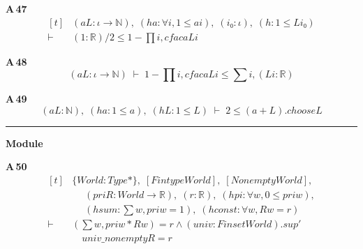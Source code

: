 \noindent\textbf{A\,47}\quad{}
{\footnotesize\[ \begin{aligned}[t]
&(\mathit{a} \mathit{L} : \iota \to \mathbb{N} ),\; (\mathit{ha} : \forall \mathit{i}, 1 \leq \mathit{a} \mathit{i}),\; (\mathit{i₀} : \iota ),\; (\mathit{h} : 1 \leq \mathit{L} \mathit{i₀})\\
\vdash\;&(1:\mathbb{R} ) / 2 \leq 1 - \textstyle\prod \mathit{i}, \mathit{cfac} \mathit{a} \mathit{L} \mathit{i}
\end{aligned} \]}

\noindent\textbf{A\,48}\quad{}
{\footnotesize\[ (\mathit{a} \mathit{L} : \iota \to \mathbb{N} ) \;\vdash\; 1 - \textstyle\prod \mathit{i}, \mathit{cfac} \mathit{a} \mathit{L} \mathit{i} \leq \textstyle\sum \mathit{i}, (\mathit{L} \mathit{i} : \mathbb{R} ) \]}

\noindent\textbf{A\,49}\quad{}
{\footnotesize\[ (\mathit{a} \mathit{L} : \mathbb{N} ),\; (\mathit{ha} : 1 \leq \mathit{a}),\; (\mathit{hL} : 1 \leq \mathit{L}) \;\vdash\; 2 \leq (\mathit{a} + \mathit{L}).\mathit{choose} \mathit{L} \]}

\vspace{4pt}\noindent\rule{\columnwidth}{0.4pt}\par\vspace{2pt}
\noindent\textbf{Module }\par\vspace{3pt}

\noindent\textbf{A\,50}\quad{}
{\footnotesize\[ \begin{aligned}[t]
&\{ \mathit{World} : \mathit{Type}*\},\; [\mathit{Fintype} \mathit{World}],\; [\mathit{Nonempty} \mathit{World}],\\
&\quad \; (\mathit{pri} \mathit{R} : \mathit{World} \to \mathbb{R} ),\; (\mathit{r} : \mathbb{R} ),\; (\mathit{hpi} : \forall \mathit{w}, 0 \leq \mathit{pri} \mathit{w}),\\
&\quad \; (\mathit{hsum} : \textstyle\sum \mathit{w}, \mathit{pri} \mathit{w} = 1),\; (\mathit{hconst} : \forall \mathit{w}, \mathit{R} \mathit{w} = \mathit{r})\\
\vdash\;&(\textstyle\sum \mathit{w}, \mathit{pri} \mathit{w} * \mathit{R} \mathit{w}) = \mathit{r} \wedge (\mathit{univ} : \mathit{Finset} \mathit{World}).\mathit{sup'}\\
&\quad \mathit{univ\_nonempty} \mathit{R} = \mathit{r}
\end{aligned} \]}

